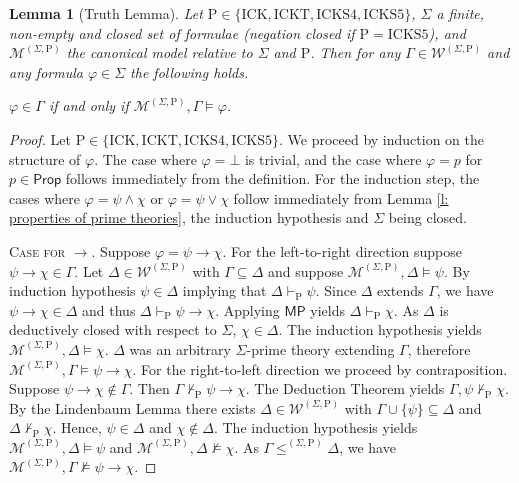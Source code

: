 \documentclass{myifcolog}
\newcommand\Prop {\mathsf{Prop}}
\newcommand{\fw}{\mathcal{M}}
\newcommand{\W}{\mathcal{W}}
\newcommand{\hick}{\mathrm{ICK}}
\newcommand{\hickt}{\mathrm{ICKT}}
\newcommand{\hicks}{\mathrm{ICKS4}}
\newcommand{\hickss}{\mathrm{ICKS5}}
\newcommand{\hickp}{\mathrm{P}}
\newtheorem{lemma}[theorem]{Lemma}
\numberwithin{theorem}{section}
\begin{document}
\begin{lemma}[Truth Lemma] \label{l: truth lemma}
Let $\hickp \in \{\hick, \hickt, \hicks, \hickss\}$, $\Sigma$ a finite, non-empty and closed set of formulae (negation closed if $\hickp = \hickss$), and $\fw^{(\Sigma, \hickp)}$ the canonical model relative to $\Sigma$ and $\hickp$. Then for any $\Gamma \in \W^{(\Sigma, \hickp)}$ and any formula $\varphi \in \Sigma$ the following holds.
\begin{center}
    $\varphi \in \Gamma$ if and only if $\fw^{(\Sigma, \hickp)}, \Gamma \models \varphi$.
\end{center}
\end{lemma}
\begin{proof}
    Let $\hickp \in \{\hick, \hickt, \hicks, \hickss\}$. We proceed by induction on the structure of $\varphi$. The case where $\varphi = \bot$ is trivial, and the case where $\varphi = p$ for $p \in \Prop$ follows immediately from the definition. For the induction step, the cases where $\varphi = \psi \wedge \chi$ or $\varphi = \psi \vee \chi$ follow immediately from Lemma \ref{l: properties of prime theories}, the induction hypothesis and $\Sigma$ being closed. \smallskip
    
    \noindent \textsc{Case for $\rightarrow$.} Suppose $\varphi = \psi \rightarrow \chi$. For the left-to-right direction suppose $\psi \rightarrow \chi \in \Gamma$. Let $\Delta \in \W^{(\Sigma, \hickp)}$ with $\Gamma \subseteq \Delta$ and suppose $\fw^{(\Sigma, \hickp)}, \Delta \models \psi$. By induction hypothesis $\psi \in \Delta$ implying that $\Delta \vdash_\mathrm{P} \psi$. Since $\Delta$ extends $\Gamma$, we have $\psi \rightarrow \chi \in \Delta$ and thus $\Delta \vdash_\mathrm{P} \psi \rightarrow \chi$. Applying $\mathsf{MP}$ yields $\Delta \vdash_\mathrm{P} \chi$. As $\Delta$ is deductively closed with respect to $\Sigma$, $\chi \in \Delta$. The induction hypothesis yields $\fw^{(\Sigma, \hickp)}, \Delta \models \chi$. $\Delta$ was an arbitrary $\Sigma$-prime theory extending $\Gamma$, therefore $\fw^{(\Sigma, \hickp)}, \Gamma \models \psi \rightarrow \chi$. 
    For the right-to-left direction we proceed by contraposition. Suppose $\psi \rightarrow \chi \not \in \Gamma$. Then $\Gamma \not \vdash_\mathrm{P} \psi \rightarrow \chi$. The Deduction Theorem yields $\Gamma, \psi \not \vdash_\mathrm{P} \chi$. By the Lindenbaum Lemma there exists $\Delta \in \W^{(\Sigma, \hickp)}$ with $\Gamma \cup \{\psi\} \subseteq \Delta$ and $\Delta \not \vdash_\mathrm{P} \chi$. Hence, $\psi \in \Delta$ and $\chi \not \in \Delta$. The induction hypothesis yields $\fw^{(\Sigma, \hickp)}, \Delta \models \psi$ and $\fw^{(\Sigma, \hickp)}, \Delta \not \models \chi$. As $\Gamma \leq^{(\Sigma, \hickp)} \Delta$, we have $\fw^{(\Sigma, \hickp)}, \Gamma \not \models \psi \rightarrow \chi$. \smallskip
    

\end{proof}
\end{document}
